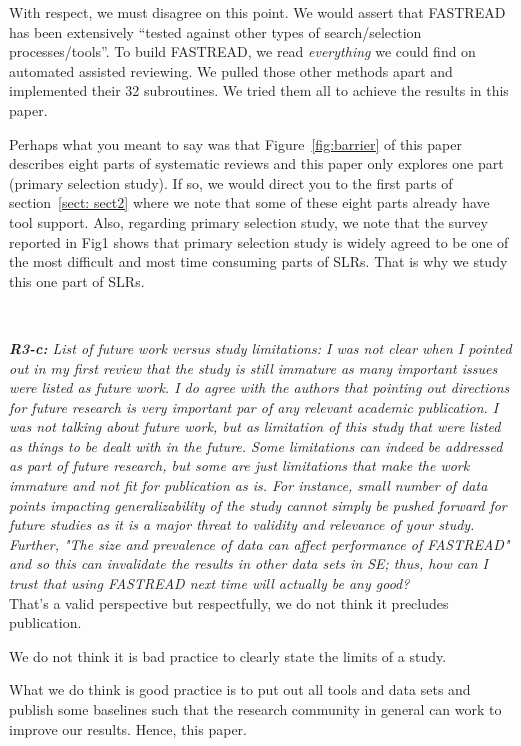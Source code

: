 \documentclass{svjour3}
\theoremstyle{break}
\newcommand{\review}[1]{{\textit{#1}}~\\}
\begin{document}
With respect, we must disagree on this point. We would assert that FASTREAD has been  extensively ``tested against other types of search/selection processes/tools''. To build FASTREAD,  we read \textit{everything} we could find on automated assisted reviewing. We pulled those other methods apart and implemented their 32 subroutines. We tried them all to achieve the results in this paper. 

Perhaps what you meant to say was that   Figure~\ref{fig:barrier} of this paper describes eight  parts of systematic reviews and this paper only explores one part (primary selection study). If so, we would direct you to the first parts of section~\ref{sect: sect2} where we note that some of these eight  parts already have tool support. Also, regarding primary selection study, we note that the survey reported in Fig1 shows that primary selection study is widely agreed to be one of the most difficult and most time consuming parts of SLRs.  That is why we study this one part of SLRs.

\par ~

\review{\textbf{R3-c:} List of future work versus study limitations: I was not clear when I pointed out in my first review that the study is still immature as many important issues were listed as future work. I do agree with the authors that pointing out directions for future research is very important par of any relevant academic publication. I was not talking about future work, but as limitation of this study that were listed as things to be dealt with in the future. Some limitations can indeed be addressed as part of future research, but some are just limitations that make the work immature and not fit for publication as is. For instance, small number of data points impacting generalizability of the study cannot simply be pushed forward for future studies as it is a major threat to validity and relevance of your study. Further, "The size and prevalence of data can affect performance of FASTREAD" and so this can invalidate the results in other data sets in SE; thus, how can I trust that using FASTREAD next time will actually be any good?}

That’s a valid perspective but respectfully, we do not think it precludes publication. 

We do not think it is bad practice to clearly state the limits of a study.  

What we do think is good practice is to put out all tools and data sets and publish some baselines such that the research community in general can work to improve our results. Hence, this paper.
\end{document}
